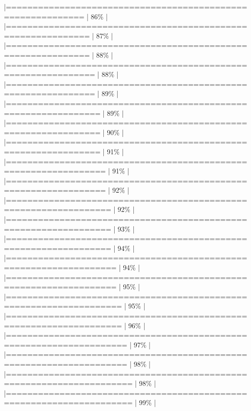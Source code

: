 \documentclass[
]{article}
\newenvironment{Shaded}{}{}
\begin{document}
\begin{Shaded}
\begin{Highlighting}[]
|============================================================          |  86\%  |                                                                              |=============================================================         |  87\%  |                                                                              |=============================================================         |  88\%  |                                                                              |==============================================================        |  88\%  |                                                                              |==============================================================        |  89\%  |                                                                              |===============================================================       |  89\%  |                                                                              |===============================================================       |  90\%  |                                                                              |===============================================================       |  91\%  |                                                                              |================================================================      |  91\%  |                                                                              |================================================================      |  92\%  |                                                                              |=================================================================     |  92\%  |                                                                              |=================================================================     |  93\%  |                                                                              |=================================================================     |  94\%  |                                                                              |==================================================================    |  94\%  |                                                                              |==================================================================    |  95\%  |                                                                              |===================================================================   |  95\%  |                                                                              |===================================================================   |  96\%  |                                                                              |====================================================================  |  97\%  |                                                                              |====================================================================  |  98\%  |                                                                              |===================================================================== |  98\%  |                                                                              |===================================================================== |  99\%  |                                     
\end{Highlighting}
\end{Shaded}
\end{document}
